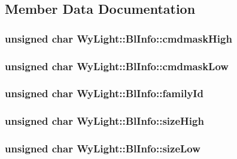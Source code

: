 \subsection{Member Data Documentation}
\hypertarget{struct_wy_light_1_1_bl_info_a6dfdd03e93374830817109e096103b69}{
\subsubsection[{cmdmask\-High}]{\setlength{\rightskip}{0pt plus 5cm}unsigned char Wy\-Light\-::\-Bl\-Info\-::cmdmask\-High}}\label{struct_wy_light_1_1_bl_info_a6dfdd03e93374830817109e096103b69}
\hypertarget{struct_wy_light_1_1_bl_info_a7ebeda2077accbc4de2305114efb6f4b}{
\subsubsection[{cmdmask\-Low}]{\setlength{\rightskip}{0pt plus 5cm}unsigned char Wy\-Light\-::\-Bl\-Info\-::cmdmask\-Low}}\label{struct_wy_light_1_1_bl_info_a7ebeda2077accbc4de2305114efb6f4b}
\hypertarget{struct_wy_light_1_1_bl_info_a716367b951d25272fc9f95324e10fa73}{
\subsubsection[{family\-Id}]{\setlength{\rightskip}{0pt plus 5cm}unsigned char Wy\-Light\-::\-Bl\-Info\-::family\-Id}}\label{struct_wy_light_1_1_bl_info_a716367b951d25272fc9f95324e10fa73}
\hypertarget{struct_wy_light_1_1_bl_info_a95dfd12b33d938d0130d1e3326f9d711}{
\subsubsection[{size\-High}]{\setlength{\rightskip}{0pt plus 5cm}unsigned char Wy\-Light\-::\-Bl\-Info\-::size\-High}}\label{struct_wy_light_1_1_bl_info_a95dfd12b33d938d0130d1e3326f9d711}
\hypertarget{struct_wy_light_1_1_bl_info_a0fdc843fbc878f3570751ef38fa69e0e}{
\subsubsection[{size\-Low}]{\setlength{\rightskip}{0pt plus 5cm}unsigned char Wy\-Light\-::\-Bl\-Info\-::size\-Low}}\label{struct_wy_light_1_1_bl_info_a0fdc843fbc878f3570751ef38fa69e0e}
